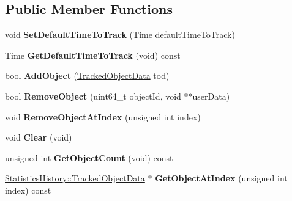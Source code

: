 \subsection*{Public Member Functions}
\begin{DoxyCompactItemize}
\item 
\hypertarget{class_rak_net_1_1_statistics_history_aca8760a1e948038a32c892154b176319}{void {\bfseries Set\-Default\-Time\-To\-Track} (Time default\-Time\-To\-Track)}\label{class_rak_net_1_1_statistics_history_aca8760a1e948038a32c892154b176319}

\item 
\hypertarget{class_rak_net_1_1_statistics_history_aa005fbe0071ea6f76ed7969dff0fdd1c}{Time {\bfseries Get\-Default\-Time\-To\-Track} (void) const }\label{class_rak_net_1_1_statistics_history_aa005fbe0071ea6f76ed7969dff0fdd1c}

\item 
\hypertarget{class_rak_net_1_1_statistics_history_aa36636973f27b8ca74f2bb289a8c3f53}{bool {\bfseries Add\-Object} (\hyperlink{struct_rak_net_1_1_statistics_history_1_1_tracked_object_data}{Tracked\-Object\-Data} tod)}\label{class_rak_net_1_1_statistics_history_aa36636973f27b8ca74f2bb289a8c3f53}

\item 
\hypertarget{class_rak_net_1_1_statistics_history_ae69b34d4935225ba60d3050f8dad51bf}{bool {\bfseries Remove\-Object} (uint64\-\_\-t object\-Id, void $\ast$$\ast$user\-Data)}\label{class_rak_net_1_1_statistics_history_ae69b34d4935225ba60d3050f8dad51bf}

\item 
\hypertarget{class_rak_net_1_1_statistics_history_a7d4bfcbaa5b0513a112512623848bfcc}{void {\bfseries Remove\-Object\-At\-Index} (unsigned int index)}\label{class_rak_net_1_1_statistics_history_a7d4bfcbaa5b0513a112512623848bfcc}

\item 
\hypertarget{class_rak_net_1_1_statistics_history_a8754cc1e1a9d05067425ad5e2a64d3a5}{void {\bfseries Clear} (void)}\label{class_rak_net_1_1_statistics_history_a8754cc1e1a9d05067425ad5e2a64d3a5}

\item 
\hypertarget{class_rak_net_1_1_statistics_history_aec920850b36973ec7e80fc5563b4eb31}{unsigned int {\bfseries Get\-Object\-Count} (void) const }\label{class_rak_net_1_1_statistics_history_aec920850b36973ec7e80fc5563b4eb31}

\item 
\hypertarget{class_rak_net_1_1_statistics_history_a48d31a001a51d40ca4210beea171e846}{\hyperlink{struct_rak_net_1_1_statistics_history_1_1_tracked_object_data}{Statistics\-History\-::\-Tracked\-Object\-Data} $\ast$ {\bfseries Get\-Object\-At\-Index} (unsigned int index) const }\label{class_rak_net_1_1_statistics_history_a48d31a001a51d40ca4210beea171e846}


\end{DoxyCompactItemize}
